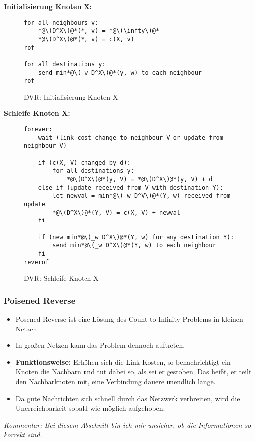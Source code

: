 				\textbf{Initialisierung Knoten X:}
				\begin{figure}[H]
					\centering
					\begin{lstlisting}
for all neighbours v:
	*@\(D^X\)@*(*, v) = *@\(\infty\)@*
	*@\(D^X\)@*(*, v) = c(X, v)
rof

for all destinations y:
	send min*@\(_w D^X\)@*(y, w) to each neighbour
rof
                	\end{lstlisting}
					\caption{DVR: Initialisierung Knoten X}
				\end{figure}

				\textbf{Schleife Knoten X:}
				\begin{figure}[H]
					\centering
					\begin{lstlisting}
forever:
	wait (link cost change to neighbour V or update from neighbour V)

	if (c(X, V) changed by d):
		for all destinations y:
			*@\(D^X\)@*(y, V) = *@\(D^X\)@*(y, V) + d
	else if (update received from V with destination Y):
		let newval = min*@\(_w D^V\)@*(Y, w) received from update
		*@\(D^X\)@*(Y, V) = c(X, V) + newval
	fi

	if (new min*@\(_w D^X\)@*(Y, w) for any destination Y):
		send min*@\(_w D^X\)@*(Y, w) to each neighbour
	fi
reverof
                	\end{lstlisting}
					\caption{DVR: Schleife Knoten X}
				\end{figure}

			\subsubsection{Poisened Reverse}
				\begin{itemize}
					\item Posened Reverse ist eine Lösung des Count-to-Infinity Problems in kleinen Netzen.
					\item In großen Netzen kann das Problem dennoch auftreten.
					\item \textbf{Funktionsweise:} Erhöhen sich die Link-Kosten, so benachrichtigt ein Knoten die Nachbarn und tut dabei so, als sei er gestoben. Das heißt, er teilt den Nachbarknoten mit, eine Verbindung dauere unendlich lange.
					\item Da gute Nachrichten sich schnell durch das Netzwerk verbreiten, wird die Unerreichbarkeit sobald wie möglich aufgehoben.
				\end{itemize}

				\textit{Kommentar: Bei diesem Abschnitt bin ich mir unsicher, ob die Informationen so korrekt sind.} 

